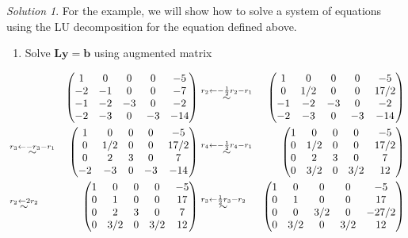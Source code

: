 \documentclass[
]{book}
\providecommand{\tightlist}{%
  \setlength{\itemsep}{0pt}\setlength{\parskip}{0pt}}
\theoremstyle{definition}
\theoremstyle{definition}
\theoremstyle{definition}
\theoremstyle{remark}
\newtheorem*{solution}{Solution}
\begin{document}
\begin{solution}

For the example, we will show how to solve a system of equations using the LU decomposition for the equation defined above.

\begin{enumerate}
\def\labelenumi{\arabic{enumi})}
\tightlist
\item
  Solve \(\mathbf{L} \mathbf{y} = \mathbf{b}\) using augmented matrix
\end{enumerate}

\[
\begin{aligned}
& & \begin{pmatrix} 1 & 0 & 0 & 0 & -5 \\ -2 & -1 & 0 & 0 & -7 \\ -1 & -2 & -3 & 0 & -2 \\ -2 & -3 & 0 & -3 & -14 \end{pmatrix} & \stackrel{r_2 \leftarrow -\frac{1}{2} r_2 - r_1}{\huge \sim} & \begin{pmatrix} 1 & 0 & 0 & 0 & -5 \\ 0 & 1/2 & 0 & 0 & 17/2 \\ -1 & -2 & -3 & 0 & -2 \\ -2 & -3 & 0 & -3 & -14 \end{pmatrix} \\
& \stackrel{r_3 \leftarrow - r_3 - r_1}{\huge \sim} & \begin{pmatrix} 1 & 0 & 0 & 0 & -5 \\ 0 & 1/2 & 0 & 0 & 17/2 \\ 0 & 2 & 3 & 0 & 7 \\ -2 & -3 & 0 & -3 & -14 \end{pmatrix} & \stackrel{r_4 \leftarrow - \frac{1}{2} r_4 - r_1}{\huge \sim} & \begin{pmatrix} 1 & 0 & 0 & 0 & -5 \\ 0 & 1/2 & 0 & 0 & 17/2 \\ 0 & 2 & 3 & 0 & 7 \\ 0 & 3/2 & 0 & 3/2 & 12 \end{pmatrix} \\
& \stackrel{r_2 \leftarrow 2 r_2}{\huge \sim} & \begin{pmatrix} 1 & 0 & 0 & 0 & -5 \\ 0 & 1 & 0 & 0 & 17 \\ 0 & 2 & 3 & 0 & 7 \\ 0 & 3/2 & 0 & 3/2 & 12 \end{pmatrix} & \stackrel{r_3 \leftarrow \frac{1}{2} r_3 - r_2}{\huge \sim} & \begin{pmatrix} 1 & 0 & 0 & 0 & -5 \\ 0 & 1 & 0 & 0 & 17 \\ 0 & 0 & 3/2 & 0 & -27/2 \\ 0 & 3/2 & 0 & 3/2 & 12 \end{pmatrix} \\

\end{aligned}\]
\end{solution}
\end{document}

